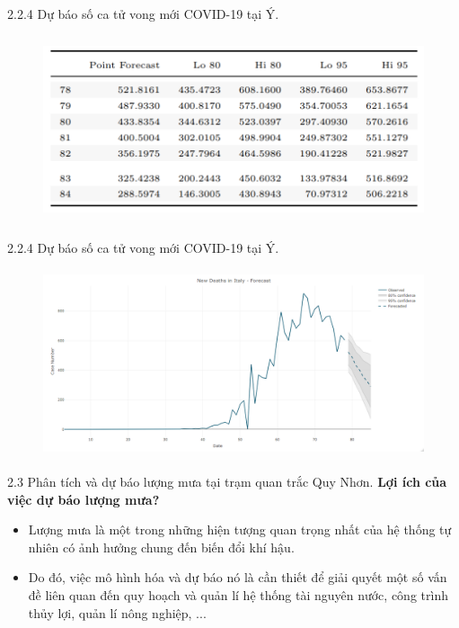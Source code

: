 \documentclass[notheorems,envcountsect,hyperref=unicode]{beamer}
\begin{document}
\begin{frame}{2.2.4 Dự báo số ca tử vong mới COVID-19 tại Ý.}
	\begin{figure}[!htb]
		\centering
		\includegraphics[width=1\linewidth,height=5.5cm]{duong7} 
	\end{figure}
\end{frame}

\begin{frame}{2.2.4 Dự báo số ca tử vong mới COVID-19 tại Ý.}
	\begin{figure}[!htb]
		\centering
		\includegraphics[width=1\linewidth,height=5.5cm]{A8} 
	\end{figure}
\end{frame}

\begin{frame}{2.3 Phân tích và dự báo lượng mưa tại trạm quan trắc Quy Nhơn.}
\textbf{Lợi ích của việc dự báo lượng mưa?}\\
\begin{itemize}
\item Lượng mưa là một trong những hiện tượng quan trọng nhất của hệ thống tự nhiên có ảnh hưởng chung đến biến đổi khí hậu.
\item Do đó, việc mô hình hóa và dự báo nó là cần thiết để giải quyết một số vấn đề liên quan đến quy hoạch và quản lí hệ thống tài nguyên nước, công trình thủy lợi, quản lí nông nghiệp, ...
\end{itemize}
\end{frame}
\end{document}
